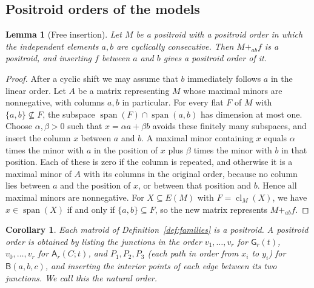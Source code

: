 \documentclass[11pt]{amsart}
\newtheorem{lemma}[theorem]{Lemma}
\newtheorem{corollary}[theorem]{Corollary}
\theoremstyle{definition}
\theoremstyle{remark}
\numberwithin{equation}{section}
\newcommand{\cl}{\operatorname{cl}}
\newcommand{\GW}{\mathsf{G}}
\newcommand{\FA}{\mathsf{A}}
\newcommand{\FB}{\mathsf{B}}
\begin{document}
\subsection{Positroid orders of the models}

\begin{lemma}[Free insertion]\label{lem:insert}
Let $M$ be a positroid with a positroid order in which the independent elements $a,b$ are cyclically consecutive. Then $M+_{ab}f$ is a positroid, and inserting $f$ between $a$ and $b$ gives a positroid order of it.
\end{lemma}

\begin{proof}
After a cyclic shift we may assume that $b$ immediately follows $a$ in the linear order. Let $A$ be a matrix representing $M$ whose maximal minors are nonnegative, with columns $a,b$ in particular. For every flat $F$ of $M$ with $\{a,b\}\not\subseteq F$, the subspace $\operatorname{span}(F)\cap\operatorname{span}(a,b)$ has dimension at most one. Choose $\alpha,\beta>0$ such that $x=\alpha a+\beta b$ avoids these finitely many subspaces, and insert the column $x$ between $a$ and $b$. A maximal minor containing $x$ equals $\alpha$ times the minor with $a$ in the position of $x$ plus $\beta$ times the minor with $b$ in that position. Each of these is zero if the column is repeated, and otherwise it is a maximal minor of $A$ with its columns in the original order, because no column lies between $a$ and the position of $x$, or between that position and $b$. Hence all maximal minors are nonnegative. For $X\subseteq E(M)$ with $F=\cl_M(X)$, we have $x\in\operatorname{span}(X)$ if and only if $\{a,b\}\subseteq F$, so the new matrix represents $M+_{ab}f$.
\end{proof}

\begin{corollary}\label{cor:positroidmodels}
Each matroid of Definition~\ref{def:families} is a positroid. A positroid order is obtained by listing the junctions in the order $v_1,\dots,v_r$ for $\GW_r(t)$, $v_0,\dots,v_r$ for $\FA_r(C;t)$, and $P_1,P_2,P_3$ (each path in order from $x_i$ to $y_i$) for $\FB(a,b,c)$, and inserting the interior points of each edge between its two junctions. We call this the \emph{natural order}.
\end{corollary}
\end{document}
